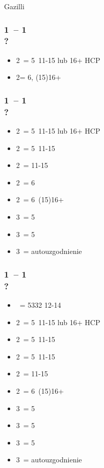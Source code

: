 \documentclass[12pt, a4paper]{report}
\begin{document}
\newpage

Gazilli

\subsubsection*{1\hearts\ -- 1\spades\ \\ ?}
\begin{itemize}
    \item 2\clubs\ = 5\clubs\ 11-15 lub 16+ HCP \fonce
    \item 2\nt = 6\minor, (15)16+
\end{itemize}

\subsubsection*{1\hearts\ -- 1\ntx\ \\ ?}
\begin{itemize}
    \item 2\clubs\ = 5\hearts\clubs\ 11-15 lub 16+ HCP \fonce
    \item 2\diams\ = 5\diams\ 11-15
    \item 2\hearts\ = 11-15
    \item 2\spades\ = 6\spades\ \gf
    \item 2\ntx\ = 6\minor\ (15)16+
    \item 3\clubs\ = 5\clubs\ \invp
    \item 3\diams\ = 5\diams\ \invp
    \item 3\hearts\ = autouzgodnienie
\end{itemize}

\subsubsection*{1\spades\ -- 1\ntx\ \\ ?}
\begin{itemize}
    \item \pass\ = 5332 12-14
    \item 2\clubs\ = 5\spades\clubs\ 11-15 lub 16+ HCP \fonce
    \item 2\diams\ = 5\diams\ 11-15
    \item 2\hearts\ = 5\hearts\ 11-15
    \item 2\spades\ = 11-15
    \item 2\ntx\ = 6\minor\ (15)16+
    \item 3\clubs\ = 5\clubs\ \invp
    \item 3\diams\ = 5\diams\ \invp
    \item 3\hearts\ = 5\hearts\ \invp
    \item 3\spades\ = autouzgodnienie
\end{itemize}
\end{document}
